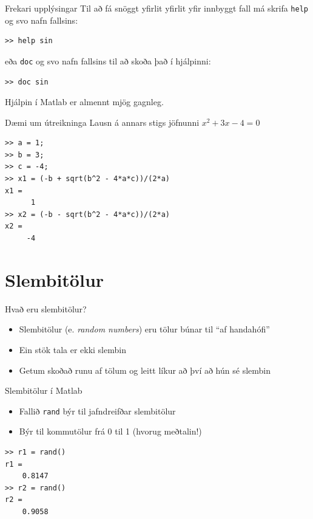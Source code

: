 \documentclass[handout]{beamer}
\begin{document}
\begin{frame}[fragile]{Frekari upplýsingar}
Til að fá snöggt yfirlit yfirlit yfir innbyggt fall má skrifa \texttt{help} og svo nafn fallsins:
\begin{verbatim}
>> help sin
\end{verbatim}
eða \texttt{doc} og svo nafn fallsins til að skoða það í hjálpinni:
\begin{verbatim}
>> doc sin
\end{verbatim}
Hjálpin í Matlab er almennt mjög gagnleg.
\end{frame}

\begin{frame}{Dæmi um útreikninga}
\vspace{1cm}
Lausn á annars stigs jöfnunni $x^2 + 3x - 4 = 0$
\begin{verbatim}
>> a = 1;
>> b = 3;
>> c = -4;
>> x1 = (-b + sqrt(b^2 - 4*a*c))/(2*a)
x1 =
      1
>> x2 = (-b - sqrt(b^2 - 4*a*c))/(2*a)
x2 =
     -4
\end{verbatim}
\end{frame}

\section{Slembitölur}

\begin{frame}{Hvað eru slembitölur?}
\begin{itemize}
 \item Slembitölur (e. \emph{random numbers}) eru tölur búnar til ``af handahófi''
 \item Ein stök tala er ekki slembin
 \item Getum skoðað runu af tölum og leitt líkur að því að hún sé slembin
\end{itemize}
\end{frame}

\begin{frame}[fragile]{Slembitölur í Matlab}
\begin{itemize}
 \item Fallið \texttt{rand} býr til jafndreifðar slembitölur
 \item Býr til kommutölur frá 0 til 1 (hvorug meðtalin!)
\end{itemize}
\begin{verbatim}
>> r1 = rand()
r1 =
    0.8147
>> r2 = rand()
r2 =
    0.9058
\end{verbatim}
\end{frame}
\end{document}
